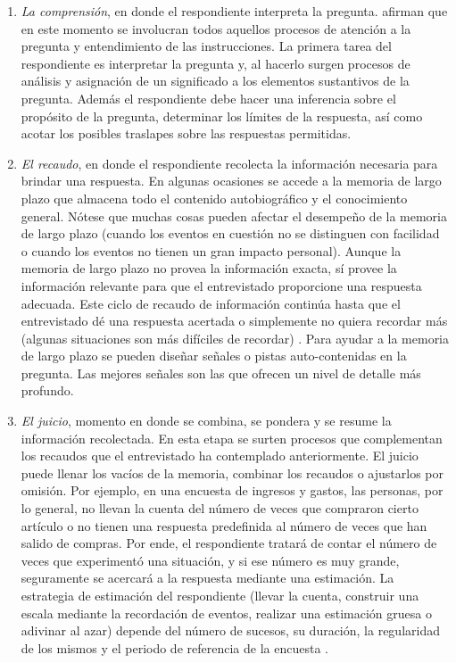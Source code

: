 \documentclass[
  12pt,
  spanish,
]{book}
\providecommand{\tightlist}{%
  \setlength{\itemsep}{0pt}\setlength{\parskip}{0pt}}
\begin{document}
\begin{enumerate}
\def\labelenumi{\arabic{enumi}.}
\tightlist
\item
  \emph{La comprensión}, en donde el respondiente interpreta la pregunta. \citet{Groves_Fowler_Couper_Lepkowski_Singer_Tourangeau_2009} afirman que en este momento se involucran todos aquellos procesos de atención a la pregunta y entendimiento de las instrucciones. La primera tarea del respondiente es interpretar la pregunta y, al hacerlo surgen procesos de análisis y asignación de un significado a los elementos sustantivos de la pregunta. Además el respondiente debe hacer una inferencia sobre el propósito de la pregunta, determinar los límites de la respuesta, así como acotar los posibles traslapes sobre las respuestas permitidas.
\item
  \emph{El recaudo}, en donde el respondiente recolecta la información necesaria para brindar una respuesta. En algunas ocasiones se accede a la memoria de largo plazo que almacena todo el contenido autobiográfico y el conocimiento general. Nótese que muchas cosas pueden afectar el desempeño de la memoria de largo plazo (cuando los eventos en cuestión no se distinguen con facilidad o cuando los eventos no tienen un gran impacto personal). Aunque la memoria de largo plazo no provea la información exacta, sí provee la información relevante para que el entrevistado proporcione una respuesta adecuada. Este ciclo de recaudo de información continúa hasta que el entrevistado dé una respuesta acertada o simplemente no quiera recordar más (algunas situaciones son más difíciles de recordar) \citep{Groves_Fowler_Couper_Lepkowski_Singer_Tourangeau_2009}. Para ayudar a la memoria de largo plazo se pueden diseñar señales o pistas auto-contenidas en la pregunta. Las mejores señales son las que ofrecen un nivel de detalle más profundo.
\item
  \emph{El juicio}, momento en donde se combina, se pondera y se resume la información recolectada. En esta etapa se surten procesos que complementan los recaudos que el entrevistado ha contemplado anteriormente. El juicio puede llenar los vacíos de la memoria, combinar los recaudos o ajustarlos por omisión. Por ejemplo, en una encuesta de ingresos y gastos, las personas, por lo general, no llevan la cuenta del número de veces que compraron cierto artículo o no tienen una respuesta predefinida al número de veces que han salido de compras. Por ende, el respondiente tratará de contar el número de veces que experimentó una situación, y si ese número es muy grande, seguramente se acercará a la respuesta mediante una estimación. La estrategia de estimación del respondiente (llevar la cuenta, construir una escala mediante la recordación de eventos, realizar una estimación gruesa o adivinar al azar) depende del número de sucesos, su duración, la regularidad de los mismos y el periodo de referencia de la encuesta \citep{Groves_Fowler_Couper_Lepkowski_Singer_Tourangeau_2009}.

\end{enumerate}
\end{document}
